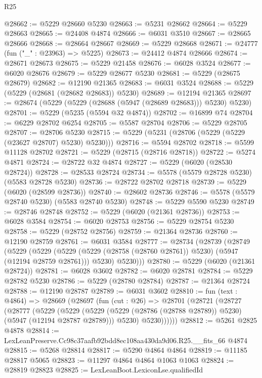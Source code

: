 \begin{lexlean}{R25}
\begin{coremodule}
@28662 := @5229 @28660 @5230
@28663 := @5231 @28662
@28664 := @5229 @28663
@28665 := @24408 @4874
@28666 := @6031 @3510
@28667 := @28665 @28666
@28668 := @28664 @28667
@28669 := @5229 @28668
@28671 := @24777 (fun ("_" : @23963) => @5225)
@28673 := @24412 @4874 @28666
@28674 := @28671 @28673
@28675 := @5229 @21458
@28676 := @6028 @3524
@28677 := @6020 @28676
@28679 := @5229 @28677 @5230
@28681 := @5229 (@28675 @28679)
@28682 := @12190 @21365
@28683 := @6031 @3524
@28688 := @5229 (@5229 (@28681 (@28682 @28683)) @5230)
@28689 := @12194 @21365
@28697 := @28674 (@5229 (@5229 (@28688 (@5947 (@28689 @28683))) @5230) @5230)
@28701 := @5229 (@5235 (@5594 @32 @4874))
@28702 := @16899 @74
@28704 := @6229 @28702 @6254
@28705 := @5587 @28704
@28706 := @5229 @28705
@28707 := @28706 @5230
@28715 := @5229 (@5231 (@28706 (@5229 (@5229 (@23627 @28707) @5230) @5230)))
@28716 := @5594 @28702
@28718 := @5599 @11128 @28702
@28721 := @5229 (@28715 (@28716 @28718))
@28722 := @5274 @4871
@28724 := @28722 @32 @4874
@28727 := @5229 (@6020 (@28530 @28724))
@28728 := @28533 @28724
@28734 := @5578 (@5579 @28728 @5230) (@5583 @28728 @5230)
@28736 := @28722 @28702 @28718
@28739 := @5229 (@6020 (@28599 @28736))
@28740 := @28602 @28736
@28746 := @5578 (@5579 @28740 @5230) (@5583 @28740 @5230)
@28748 := @5229 @5590 @5230
@28749 := @28746 @28748
@28752 := @5229 (@6020 (@21361 @28736))
@28753 := @6028 @3584
@28754 := @6020 @28753
@28756 := @5229 @28754 @5230
@28758 := @5229 (@28752 @28756)
@28759 := @21364 @28736
@28760 := @12190 @28759
@28761 := @6031 @3584
@28777 := @28734
    (@28739
      (@28749
        (@5229
          (@5229
            (@5229 (@5229 (@28758 (@28760 @28761)) @5230) (@5947 (@12194 @28759 @28761)))
            @5230)
          @5230)))
@28780 := @5229 (@6020 (@21361 @28724))
@28781 := @6028 @3602
@28782 := @6020 @28781
@28784 := @5229 @28782 @5230
@28786 := @5229 (@28780 @28784)
@28787 := @21364 @28724
@28788 := @12190 @28787
@28789 := @6031 @3602
@28810 := fun (text : @4864) =>
  @28669
    (@28697
      (fun (cut : @26) =>
      @28701
        (@28721
          (@28727
            (@28777
              (@5229
                (@5229
                  (@5229 (@5229 (@28786 (@28788 @28789)) @5230) (@5947 (@12194 @28787 @28789)))
                  @5230)
                @5230))))))
@28812 := @5261 @2825 @4878
@28814 := LexLeanPreserve.Cc98c37aafb92bdd8ec108aa430da9d06.R25.__fits_66 @4874
@28815 := @5268 @28814
@28817 := @5290 @4864 @4864
@28819 := @11185 @28817 @5065
@28823 := @11297 @4864 @4864 @1063 @1063
@28824 := @28819 @28823
@28825 := LexLeanBoot.LexiconLse.qualifiedId

\end{coremodule}
\end{lexlean}

